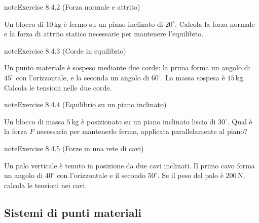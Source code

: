 \documentclass[letterpaper,10pt,italian]{jupyterBook}
\begin{document}
\begin{sphinxadmonition}{note}{Exercise 8.4.2 (Forza normale e attrito)}



\sphinxAtStartPar
Un blocco di \(10 \, \text{kg}\) è fermo su un piano inclinato di \(20^\circ\). Calcola la forza normale e la forza di attrito statico necessarie per mantenere l’equilibrio.
\end{sphinxadmonition}
 \label{exercise:ch/mechanics/statics-problems-exercise-2}

\begin{sphinxadmonition}{note}{Exercise 8.4.3 (Corde in equilibrio)}



\sphinxAtStartPar
Un punto materiale è sospeso mediante due corde: la prima forma un angolo di \(45^\circ\) con l’orizzontale, e la seconda un angolo di \(60^\circ\). La massa sospesa è \(15 \, \text{kg}\). Calcola le tensioni nelle due corde.
\end{sphinxadmonition}
 \label{exercise:ch/mechanics/statics-problems-exercise-3}

\begin{sphinxadmonition}{note}{Exercise 8.4.4 (Equilibrio su un piano inclinato)}



\sphinxAtStartPar
Un blocco di massa \(5 \, \text{kg}\) è posizionato su un piano inclinato liscio di \(30^\circ\). Qual è la forza \(F\) necessaria per mantenerlo fermo, applicata parallelamente al piano?
\end{sphinxadmonition}
 \label{exercise:ch/mechanics/statics-problems-exercise-4}

\begin{sphinxadmonition}{note}{Exercise 8.4.5 (Forze in una rete di cavi)}



\sphinxAtStartPar
Un palo verticale è tenuto in posizione da due cavi inclinati. Il primo cavo forma un angolo di \(40^\circ\) con l’orizzontale e il secondo \(50^\circ\). Se il peso del palo è \(200 \, \text{N}\), calcola le tensioni nei cavi.
\end{sphinxadmonition}


\subsection{Sistemi di punti materiali}
\label{\detokenize{ch/mechanics/statics-problems:sistemi-di-punti-materiali}} \label{exercise:ch/mechanics/statics-problems-exercise-5}
\end{document}
